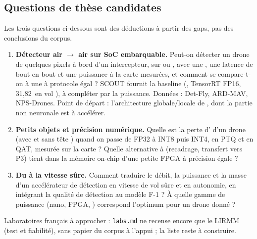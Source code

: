 \subsection{Questions de thèse candidates}

Les trois questions ci-dessous sont des déductions à partir des gaps, pas des
conclusions du corpus.
\begin{enumerate}
  \item \textbf{Détecteur air $\rightarrow$ air sur SoC embarquable.} Peut-on détecter un
    drone de quelques pixels à bord d'un intercepteur, sur  ou , avec
    une , une latence de bout en bout et une puissance à la carte mesurées, et comment
    se compare-t-on à une  à protocole égal ? SCOUT fournit la baseline 
    (, TensorRT FP16, 31,82\, en vol
    \citep[Table~III]{arxiv-2609.21005-project-scout-interceptor-drone-perimeter}\pp), à
    compléter par la puissance. Données : Det-Fly, ARD-MAV, NPS-Drones. Point de départ : l'architecture globale/locale de , dont la partie
    non neuronale est à accélérer.
  \item \textbf{Petits objets et précision numérique.} Quelle est la perte d' d'un
     drone (avec et sans tête ) quand on passe de FP32 à INT8 puis INT4, en PTQ et en
    QAT, mesurée sur la carte ? Quelle alternative à  (recadrage, transfert vers P3) tient
    dans la mémoire on-chip d'une petite FPGA à précision égale ?
  \item \textbf{Du  à la vitesse sûre.} Comment traduire le débit, la puissance et la
    masse d'un accélérateur de détection en vitesse de vol sûre et en autonomie, en
    intégrant la qualité de détection au modèle F-1 ? À quelle gamme de puissance
    (nano, FPGA, ) correspond l'optimum pour un drone donné ?
\end{enumerate}
Laboratoires français à approcher : \texttt{labs.md} ne recense encore que le LIRMM (test
et fiabilité), sans papier du corpus à l'appui ; la liste reste à construire.
